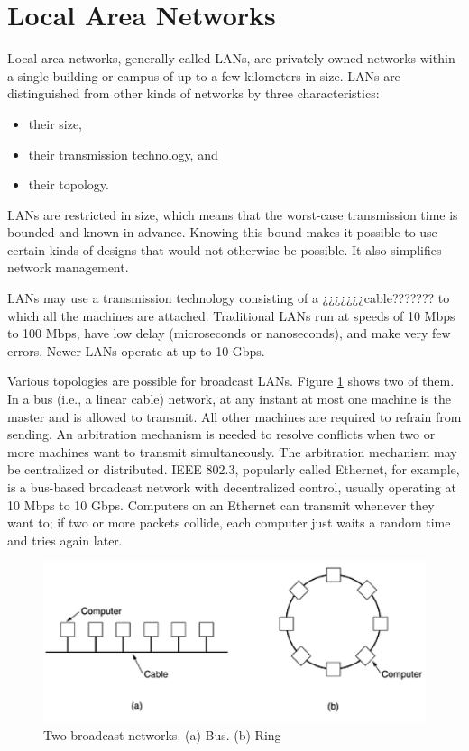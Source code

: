 \section{Local Area Networks}
Local area networks, generally called LANs, are privately-owned 
networks within a single building or campus of 
up to a few kilometers in size. LANs are 
distinguished from other kinds of networks by three  
characteristics:
  
\begin{itemize}
  \item their size, 
  \item their transmission technology, and
  \item their topology.  
\end{itemize}

LANs are restricted in size,  which means that the 
worst-case transmission time is bounded and known in 
advance. Knowing this bound makes it possible to use 
certain kinds of designs that would not otherwise 
be possible. It also simplifies network management. 

LANs may use a transmission technology consisting 
of a ¿¿¿¿¿¿¿cable??????? to which all the machines 
are attached. Traditional  LANs  run  at  
speeds  of  10  Mbps  to  100 
Mbps, have low delay (microseconds or nanoseconds), 
and make very few errors. Newer LANs operate at up to 
10 Gbps. 

Various topologies are possible for broadcast LANs. 
Figure \ref{fig:lan-networks-topologies-fig} shows 
two of them. In a 
bus (i.e., a linear cable) network, 
at any instant at most one machine is the master 
and is allowed to transmit. All other machines are 
required to refrain from sending. An arbitration 
mechanism is needed to resolve conflicts when two or more 
machines want to transmit simultaneously. The 
arbitration mechanism may be centralized or 
distributed. IEEE 802.3, popularly called Ethernet, 
for example, is a bus-based broadcast network with 
decentralized control, usually operating at 10 Mbps 
to 10 Gbps. Computers on an Ethernet can transmit 
whenever they want to; if two or more packets collide, 
each computer just waits a random time and tries again later. 


\begin{figure}
  \includegraphics[width=1.0\textwidth]{chapters/ch-networks/figures/lan-networks-topologies}
  \caption{Two broadcast networks. (a) Bus. (b) Ring \cite{Tanembaum:2003cn}}
  \label{fig:lan-networks-topologies-fig}
\end{figure}